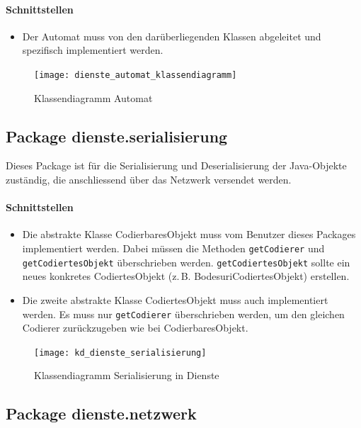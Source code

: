\documentclass[12pt,halfparskip]{scrartcl}
\begin{document}
\paragraph{Schnittstellen}
\begin{itemize}
	\item Der Automat muss von den darüberliegenden Klassen abgeleitet und spezifisch implementiert werden.
\end{itemize}	

\begin{figure}[H]
	\centering
	\texttt{[image: dienste\_automat\_klassendiagramm]}
	\caption{Klassendiagramm Automat}
	\label{fig:dienste_automat_klassendiagramm}
\end{figure}

\clearpage
\subsection{Package dienste.serialisierung}

Dieses Package ist für die Serialisierung und Deserialisierung der Java-Objekte zuständig, die anschliessend über das Netzwerk versendet werden.

\paragraph{Schnittstellen}
\begin{itemize}
	\item Die abstrakte Klasse CodierbaresObjekt muss vom Benutzer dieses Packages implementiert werden. Dabei müssen die Methoden \texttt{getCodierer} und \texttt{getCodiertesObjekt} überschrieben werden. \texttt{getCodiertesObjekt} sollte ein neues konkretes CodiertesObjekt (z.\,B. BodesuriCodiertesObjekt) erstellen.
	\item Die zweite abstrakte Klasse CodiertesObjekt muss auch implementiert werden. Es muss nur \texttt{getCodierer} überschrieben werden, um den gleichen Codierer zurückzugeben wie bei CodierbaresObjekt.
\end{itemize}

\begin{figure}[H]
	\centering
	\texttt{[image: kd\_dienste\_serialisierung]}
	\caption{Klassendiagramm Serialisierung in Dienste}
	\label{fig:kd_dienste_serialisierung}
\end{figure}

\clearpage
\subsection{Package dienste.netzwerk}
\end{document}
